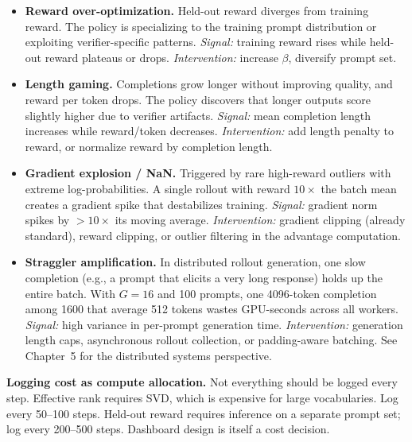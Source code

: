 \begin{itemize}
  \item \textbf{Reward over-optimization.} Held-out reward diverges from training reward. The policy is specializing to the training prompt distribution or exploiting verifier-specific patterns. \textit{Signal:} training reward rises while held-out reward plateaus or drops. \textit{Intervention:} increase $\beta$, diversify prompt set.

  \item \textbf{Length gaming.} Completions grow longer without improving quality, and reward per token drops. The policy discovers that longer outputs score slightly higher due to verifier artifacts. \textit{Signal:} mean completion length increases while reward/token decreases. \textit{Intervention:} add length penalty to reward, or normalize reward by completion length.

  \item \textbf{Gradient explosion / NaN.} Triggered by rare high-reward outliers with extreme log-probabilities. A single rollout with reward $10\times$ the batch mean creates a gradient spike that destabilizes training. \textit{Signal:} gradient norm spikes by $> 10\times$ its moving average. \textit{Intervention:} gradient clipping (already standard), reward clipping, or outlier filtering in the advantage computation.

  \item \textbf{Straggler amplification.} In distributed rollout generation, one slow completion (e.g., a prompt that elicits a very long response) holds up the entire batch. With $G = 16$ and 100 prompts, one 4096-token completion among 1600 that average 512 tokens wastes GPU-seconds across all workers. \textit{Signal:} high variance in per-prompt generation time. \textit{Intervention:} generation length caps, asynchronous rollout collection, or padding-aware batching. See Chapter~5 for the distributed systems perspective.
\end{itemize}

\textbf{Logging cost as compute allocation.} Not everything should be logged every step. Effective rank requires SVD, which is expensive for large vocabularies. Log every 50--100 steps. Held-out reward requires inference on a separate prompt set; log every 200--500 steps. Dashboard design is itself a cost decision.

\newpage
